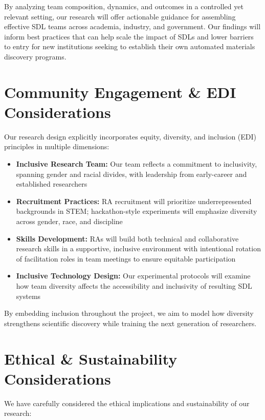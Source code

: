 \documentclass[11pt,letterpaper,twocolumn]{article}
\begin{document}
By analyzing team composition, dynamics, and outcomes in a controlled yet relevant setting, our research will offer actionable guidance for assembling effective SDL teams across academia, industry, and government. Our findings will inform best practices that can help scale the impact of SDLs and lower barriers to entry for new institutions seeking to establish their own automated materials discovery programs.

\section{Community Engagement \& EDI Considerations}
Our research design explicitly incorporates equity, diversity, and inclusion (EDI) principles in multiple dimensions:

\begin{itemize}
    \item \textbf{Inclusive Research Team:} Our team reflects a commitment to inclusivity, spanning gender and racial divides, with leadership from early-career and established researchers
    
    \item \textbf{Recruitment Practices:} RA recruitment will prioritize underrepresented backgrounds in STEM; hackathon-style experiments will emphasize diversity across gender, race, and discipline
    
    \item \textbf{Skills Development:} RAs will build both technical and collaborative research skills in a supportive, inclusive environment with intentional rotation of facilitation roles in team meetings to ensure equitable participation
    
    \item \textbf{Inclusive Technology Design:} Our experimental protocols will examine how team diversity affects the accessibility and inclusivity of resulting SDL systems
\end{itemize}

By embedding inclusion throughout the project, we aim to model how diversity strengthens scientific discovery while training the next generation of researchers.

\section{Ethical \& Sustainability Considerations}
We have carefully considered the ethical implications and sustainability of our research:
\end{document}
